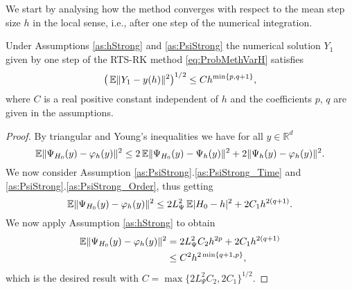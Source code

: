 \documentclass{siamart1116}
\numberwithin{theorem}{section}
\DeclarePairedDelimiter{\abs}{\lvert}{\rvert}
\DeclarePairedDelimiter{\norm}{\|}{\|}
\renewcommand{\phi}{\varphi}
\newcommand{\R}{\mathbb{R}}
\newcommand{\E}{\operatorname{\mathbb{E}}}
\begin{document}
We start by analysing how the method converges with respect to the mean step size $h$ in the local sense, i.e., after one step of the numerical integration.
\begin{lemma}\label{thm:StrongOrderLocal} Under Assumptions \ref{as:hStrong} and \ref{as:PsiStrong} the numerical solution $Y_1$ given by one step of the RTS-RK method \eqref{eq:ProbMethVarH} satisfies 
	\begin{equation}
		\big(\E\norm{Y_1 - y(h)}^2\big)^{1/2} \leq C h^{\min\{p, q + 1\}},
	\end{equation}
	where $C$ is a real positive constant independent of $h$ and the coefficients $p$, $q$ are given in the assumptions.
\end{lemma}
\begin{proof} By triangular and Young's inequalities we have for all $y \in \R^d$ 
	\begin{equation}
		\E\norm{\Psi_{H_0}(y) - \phi_h(y)}^2 \leq 2\E\norm{\Psi_{H_0}(y) - \Psi_h(y)}^2 + 2\norm{\Psi_h(y) - \phi_h(y)}^2.
	\end{equation}		
	We now consider Assumption \ref{as:PsiStrong}.\ref{as:PsiStrong_Time} and \ref{as:PsiStrong}.\ref{as:PsiStrong_Order}, thus getting
	\begin{equation}\label{eq:LocalErrorDecomposition}
		\E\norm{\Psi_{H_0}(y) - \phi_h(y)}^2 \leq 2L_{\Psi}^2 \E\abs{H_0 - h}^2 + 2C_1 h^{2(q+1)}.
	\end{equation}
	We now apply Assumption \ref{as:hStrong} to obtain
	\begin{equation}
	\begin{aligned}
		\E\norm{\Psi_{H_0}(y) - \phi_h(y)}^2 &= 2L_{\Psi}^2 C_2 h^{2p} + 2 C_1 h^{2(q+1)} \\
		&\leq C^2 h^{2\min\{q+1, p\}},
	\end{aligned}
	\end{equation}
	which is the desired result with $C = \max\{2L_{\Psi}^2 C_2, 2 C_1\}^{1/2}$.
\end{proof}
\end{document}
